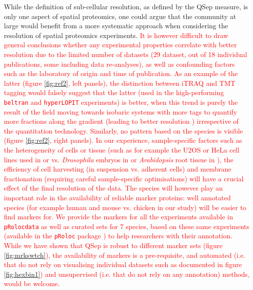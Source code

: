 \documentclass[12pt]{article}\usepackage[]{graphicx}\usepackage[]{color}
\begin{document}
While the definition of sub-cellular resolution, as defined by the
QSep measure, is only one aspect of spatial proteomics, one could
argue that the community at large would benefit from a more systematic
approach when considering the resolution of spatial proteomics
experiments. \textcolor{red}{It is however difficult to draw general
  conclusions whether any experimental properties correlate with
  better resolution due to the limited number of datasets
  (29 dataset, out of 18 individual
  publications, some including data re-analyses), as well as
  confounding factors such as the laboratory of origin and time of
  publication. As an example of the latter (figure \ref{fig:ref2},
  left panels), the distinction between iTRAQ and TMT tagging would
  falsely suggest that the latter (used in the high-performing
  \texttt{beltran} and \texttt{hyperLOPIT} experiments) is better,
  when this trend is purely the result of the field moving towards
  isobaric systems with more tags to quantify more fractions along the
  gradient (leading to better resolution \cite{Gatto:2014})
  irrespective of the quantitation technology. Similarly, no pattern
  based on the species is visible (figure \ref{fig:ref2}, right
  panels). In our experience, sample-specific factors such as the
  heterogeneity of cells or tissue (such as for example the U2OS or
  HeLa cell lines used in \cite{Thul:2017} or \cite{Itzhak:2016}
  vs. \textit{Drosophila} embryos in \cite{Tan:2009} or
  \textit{Arabidopsis} root tissue in \cite{Groen:2014}), the
  efficiency of cell harvesting (in suspension vs. adherent cells)
  and membrane fractionation (requiring careful sample-specific
  optimisations) will have a crucial effect of the final resolution of
  the data. The species will however play an important role in the
  availability of reliable marker proteins: well annotated species
  (for example human and mouse vs. chicken in our study) will be
  easier to find markers for. We provide the markers for all the
  experiments available in \texttt{pRolocdata} as well as curated sets
  for 7 species, based on these same experiments (available in the
  \texttt{pRoloc} package \cite{Gatto:2014a}) to help researchers with
  their annotation. While we have shown that QSep is robust to
  different marker sets (figure \ref{fig:mrkswtch}), the availability
  of markers is a pre-requisite, and automated (i.e. that do not rely
  on visualising individual datasets such as documented in figure
  \ref{fig:hexbin1}) and unsupervised (i.e. that do not rely on any
  annotation) methods, would be welcome.}
\end{document}
